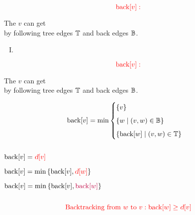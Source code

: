 \begin{frame}{}

  \[
    \textcolor{red}{\text{back}[v]:}
  \]

  \begin{center}
    The  $v$ can get \\[6pt]
    by following tree edges $\mathbb{T}$ and back edges $\mathbb{B}$. \\[15pt]

    \pause
    \begin{enumerate}[(I)]
      \centering
      \setcounter{enumi}{1}
      \item {}
    \end{enumerate}
  \end{center}
\end{frame}

\begin{frame}{}
  \[
    \textcolor{red}{\text{back}[v]:}
  \]
  \begin{center}
    The  $v$ can get \\[3pt]
    by following tree edges $\mathbb{T}$ and back edges $\mathbb{B}$.
  \end{center}

  \pause
  \[
    \text{back}[v] = \min \begin{cases} 
      \left\{v\right\} \\[5pt]
      \left\{w \mid (v, w) \in \mathbb{B}\right\} \\[5pt]
      \left\{\text{back}[w] \mid (v,w) \in \mathbb{T}\right\}
    \end{cases}
  \]

  \pause
  \begin{columns}
      \begin{description}
	\item[tree edge ($\to v$):]   $\text{back}[v] = \textcolor{red}{\textsl{d}[v]}$
	\item[back edge ($v \to w$):] $\text{back}[v] = \min \left\{\text{back}[v], \textcolor{red}{\textsl{d}[w]}\right\}$
	\item[backtracking from $w$:] $\text{back}[v] = \min \left\{\text{back}[v], \textcolor{purple}{\text{back}[w]}\right\}$
      \end{description}
  \end{columns}

  \pause
  \vspace{0.30cm}
  \[
    \textcolor{red}{\text{Backtracking from $w$ to $v$}: \text{back}[w] \ge \textsl{d}[v]}
  \]
\end{frame}

